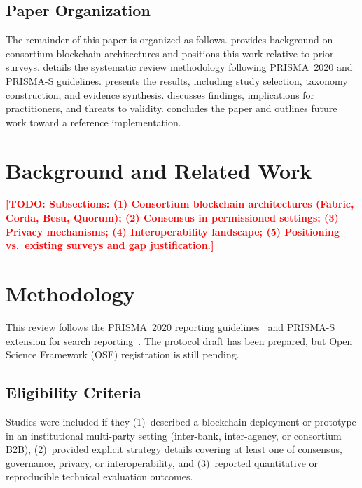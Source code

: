 \documentclass[journal]{IEEEtran}
\newcommand{\todo}[1]{\textcolor{red}{\textbf{[TODO: #1]}}}
\begin{document}
\subsection{Paper Organization}

The remainder of this paper is organized as follows.
 provides background on consortium blockchain architectures and positions this work relative to prior surveys.
 details the systematic review methodology following PRISMA~2020 and PRISMA-S guidelines.
 presents the results, including study selection, taxonomy construction, and evidence synthesis.
 discusses findings, implications for practitioners, and threats to validity.
 concludes the paper and outlines future work toward a reference implementation.

\section{Background and Related Work}
\label{sec:background}

\todo{Subsections: (1) Consortium blockchain architectures (Fabric, Corda, Besu, Quorum); (2) Consensus in permissioned settings; (3) Privacy mechanisms; (4) Interoperability landscape; (5) Positioning vs.\ existing surveys and gap justification.}

\section{Methodology}
\label{sec:method}

This review follows the PRISMA~2020 reporting guidelines~\cite{page2021prisma} and PRISMA-S extension for search reporting~\cite{rethlefsen2021prismas}.
The protocol draft has been prepared, but Open Science Framework (OSF) registration is still pending.

\subsection{Eligibility Criteria}

Studies were included if they (1)~described a blockchain deployment or prototype in an institutional multi-party setting (inter-bank, inter-agency, or consortium B2B), (2)~provided explicit strategy details covering at least one of consensus, governance, privacy, or interoperability, and (3)~reported quantitative or reproducible technical evaluation outcomes.
\end{document}

